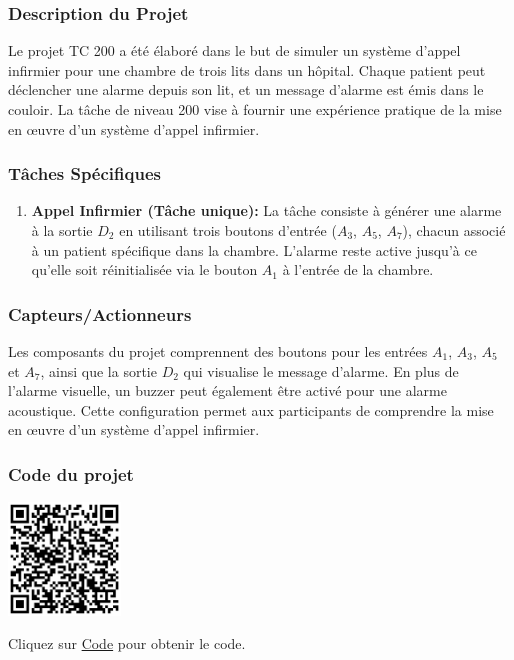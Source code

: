 \documentclass[a4paper,12pt]{report}
\begin{document}
\subsubsection{Description du Projet}

Le projet TC 200 a été élaboré dans le but de simuler un système d'appel infirmier pour une chambre de trois lits dans un hôpital. Chaque patient peut déclencher une alarme depuis son lit, et un message d'alarme est émis dans le couloir. La tâche de niveau 200 vise à fournir une expérience pratique de la mise en œuvre d'un système d'appel infirmier.

\subsubsection{Tâches Spécifiques}

\begin{enumerate}
    \item \textbf{Appel Infirmier (Tâche unique):} La tâche consiste à générer une alarme à la sortie \(D_2\) en utilisant trois boutons d'entrée (\(A_3\), \(A_5\), \(A_7\)), chacun associé à un patient spécifique dans la chambre. L'alarme reste active jusqu'à ce qu'elle soit réinitialisée via le bouton \(A_1\) à l'entrée de la chambre. 
\end{enumerate}

\subsubsection{Capteurs/Actionneurs}

Les composants du projet comprennent des boutons pour les entrées \(A_1\), \(A_3\), \(A_5\) et \(A_7\), ainsi que la sortie \(D_2\) qui visualise le message d'alarme. En plus de l'alarme visuelle, un buzzer peut également être activé pour une alarme acoustique. Cette configuration permet aux participants de comprendre la mise en œuvre d'un système d'appel infirmier.

\subsubsection{Code du projet}

\begin{minipage}{0.5\textwidth}
    \includegraphics[height=3cm]{Code TC200.png}
\end{minipage}%
\begin{minipage}{0.5\textwidth}
    Cliquez sur \href{https://github.com/DexterTaha/Controllino-PLC-Sample/blob/main/TC200/TC200_Alerte_infirmi%C3%A8re/TC200_Alerte_infirmi%C3%A8re.ino}{Code} pour obtenir le code.
\end{minipage}
\end{document}
